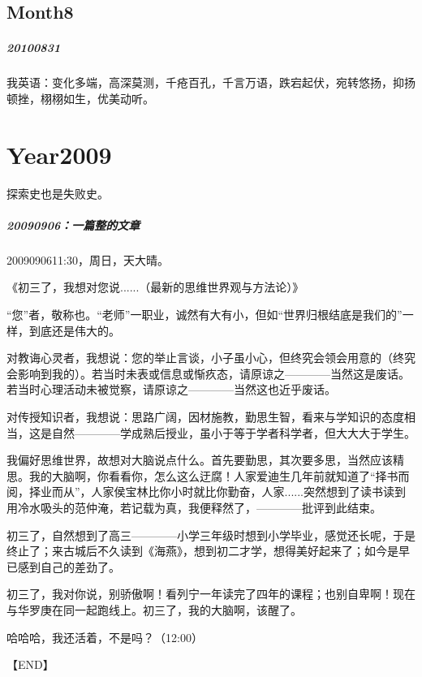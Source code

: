 \documentclass[UTF8]{Diaries}
\begin{document}
\section{Month8}
\paragraph{20100831}

我英语：变化多端，高深莫测，千疮百孔，千言万语，跌宕起伏，宛转悠扬，抑扬顿挫，栩栩如生，优美动听。 





\chapter{Year2009}

探索史也是失败史。

\paragraph{20090906：一篇整的文章}
2009090611:30，周日，天大晴。

《初三了，我想对您说......（最新的思维世界观与方法论）》

“您”者，敬称也。“老师”一职业，诚然有大有小，但如“世界归根结底是我们的”一样，到底还是伟大的。

对教诲心灵者，我想说：您的举止言谈，小子虽小心，但终究会领会用意的（终究会影响到我的）。若当时未表或信息或惭疚态，请原谅之————当然这是废话。若当时心理活动未被觉察，请原谅之————当然这也近乎废话。

对传授知识者，我想说：思路广阔，因材施教，勤思生智，看来与学知识的态度相当，这是自然————学成熟后授业，虽小于等于学者科学者，但大大大于学生。

我偏好思维世界，故想对大脑说点什么。首先要勤思，其次要多思，当然应该精思。我的大脑啊，你看看你，怎么这么迂腐！人家爱迪生几年前就知道了“择书而阅，择业而从”，人家侯宝林比你小时就比你勤奋，人家......突然想到了读书读到用冷水吸头的范仲淹，若记载为真，我便释然了，————批评到此结束。

初三了，自然想到了高三————小学三年级时想到小学毕业，感觉还长呢，于是终止了；来古城后不久读到《海燕》，想到初二才学，想得美好起来了；如今是早已感到自己的差劲了。

初三了，我对你说，别骄傲啊！看列宁一年读完了四年的课程；也别自卑啊！现在与华罗庚在同一起跑线上。初三了，我的大脑啊，该醒了。

哈哈哈，我还活着，不是吗？（12:00）

【END】
\end{document}
